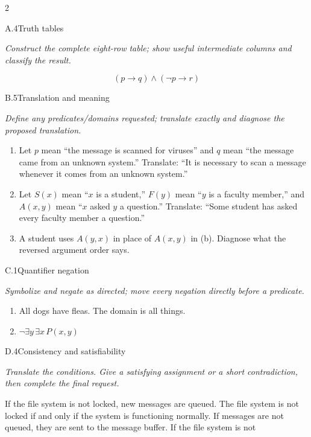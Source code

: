 \documentclass[9pt]{extarticle}
\begin{document}
\begin{multicols}{2}
\begin{CoreProblem}{A.4}{Truth tables}
{\scriptsize\textit{Construct the complete eight-row table; show useful intermediate columns and classify the result.}\par}
\[
  (p\to q)\land(\neg p\to r)
\]
\end{CoreProblem}
\begin{CoreProblem}{B.5}{Translation and meaning}
{\scriptsize\textit{Define any predicates/domains requested; translate exactly and diagnose the proposed translation.}\par}
\begin{enumerate}[label=(\alph*)]
  \item Let $p$ mean ``the message is scanned for viruses'' and $q$ mean ``the
        message came from an unknown system.'' Translate: ``It is necessary to
        scan a message whenever it comes from an unknown system.''
  \item Let $S(x)$ mean ``$x$ is a student,'' $F(y)$ mean ``$y$ is a faculty
        member,'' and $A(x,y)$ mean ``$x$ asked $y$ a question.'' Translate:
        ``Some student has asked every faculty member a question.''
  \item A student uses $A(y,x)$ in place of $A(x,y)$ in (b). Diagnose what the
        reversed argument order says.
\end{enumerate}
\end{CoreProblem}
\begin{CoreProblem}{C.1}{Quantifier negation}
{\scriptsize\textit{Symbolize and negate as directed; move every negation directly before a predicate.}\par}
\begin{enumerate}[label=(\alph*)]
  \item All dogs have fleas. The domain is all things.
  \item $\neg\exists y\,\exists x\,P(x,y)$
\end{enumerate}
\end{CoreProblem}
\columnbreak
\begin{CoreProblem}{D.4}{Consistency and satisfiability}
{\scriptsize\textit{Translate the conditions. Give a satisfying assignment or a short contradiction, then complete the final request.}\par}
If the file system is not locked, new messages are queued. The file system is
not locked if and only if the system is functioning normally. If messages are
not queued, they are sent to the message buffer. If the file system is not

\end{CoreProblem}
\end{multicols}
\end{document}
